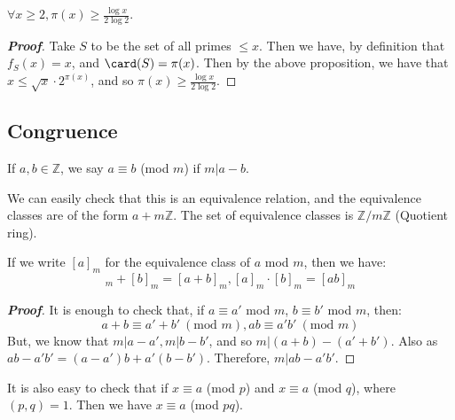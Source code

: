 \begin{corollary} $\forall x \ge 2, \pi(x) \ge \frac{\log{x}}{2 \log{2}}$.
\end{corollary}
\begin{proof}[\bf Proof] Take $S$ to be the set of all primes $\le x$. Then we have, by definition that $f_S(x)=x$, and $\card(S)=\pi(x)$. Then by the above proposition, we have that $x \le \sqrt{x} \cdot 2^{\pi(x)}$, and so $\pi(x) \ge \frac{\log{x}}{2 \log{2}}$.
\end{proof}
\subsection{Congruence}
\begin{definition} If $a,b \in \mathbb{Z}$, we say $a \equiv b$ (mod $m$) if $m | a-b$.
\end{definition}
\begin{remark}
We can easily check that this is an equivalence relation, and the equivalence classes are of the form $a+m \mathbb{Z}$. The set of equivalence classes is $\mathbb{Z}/m \mathbb{Z}$ (Quotient ring).
\end{remark}
\begin{lemma} If we write $[a]_m$ for the equivalence class of $a$ mod $m$, then we have:
\begin{equation*} [a]_m+[b]_m=[a+b]_m, [a]_m \cdot [b]_m=[ab]_m \end{equation*}
\end{lemma}
\begin{proof}[\bf Proof] It is enough to check that, if $a \equiv a'$ mod $m$, $b \equiv b'$ mod $m$, then:
\begin{equation*} a+b \equiv a'+b' ~(\text{mod } m), a b \equiv a'  b' ~(\text{mod } m)
\end{equation*}
But, we know that $m| a-a', m|b-b'$, and so $m|(a+b)-(a'+b')$. Also as $a b-a' b'=(a-a')b+a'(b-b')$. Therefore, $m|a b-a' b'$.
\end{proof}
It is also easy to check that if $x \equiv a$ (mod $p$) and $x \equiv a$ (mod $q$), where $(p,q)=1$. Then we have $x \equiv a$ (mod $pq$).

